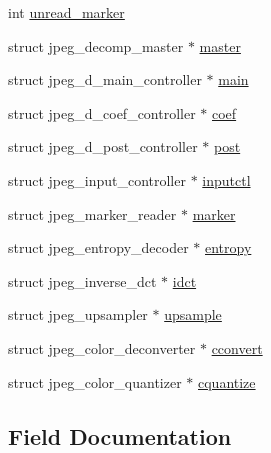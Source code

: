 \begin{DoxyCompactItemize}
int \hyperlink{structjpeg__decompress__struct_a9a030e86e1bfd0a72c520e1d18b5eef9}{unread\+\_\+marker}
\item 
struct jpeg\+\_\+decomp\+\_\+master $\ast$ \hyperlink{structjpeg__decompress__struct_ace69c5c5534a5de5b54d9c4dcd224fe6}{master}
\item 
struct jpeg\+\_\+d\+\_\+main\+\_\+controller $\ast$ \hyperlink{structjpeg__decompress__struct_aab13271d039318135ee5ca434e96c34d}{main}
\item 
struct jpeg\+\_\+d\+\_\+coef\+\_\+controller $\ast$ \hyperlink{structjpeg__decompress__struct_a25ff493a838c250917bf874a70bdb6f2}{coef}
\item 
struct jpeg\+\_\+d\+\_\+post\+\_\+controller $\ast$ \hyperlink{structjpeg__decompress__struct_aa23ccd90094cf7cf11f8f688eb28988e}{post}
\item 
struct jpeg\+\_\+input\+\_\+controller $\ast$ \hyperlink{structjpeg__decompress__struct_aba60d9f35b5b2357fd7d9b28809cb087}{inputctl}
\item 
struct jpeg\+\_\+marker\+\_\+reader $\ast$ \hyperlink{structjpeg__decompress__struct_a59a6ada58d57b412fe89e1a531323b50}{marker}
\item 
struct jpeg\+\_\+entropy\+\_\+decoder $\ast$ \hyperlink{structjpeg__decompress__struct_ac53f055b3d8103caa6c7ba4b4975eb5b}{entropy}
\item 
struct jpeg\+\_\+inverse\+\_\+dct $\ast$ \hyperlink{structjpeg__decompress__struct_a2ef67a2829f8ecebb1af0ed440bff8bf}{idct}
\item 
struct jpeg\+\_\+upsampler $\ast$ \hyperlink{structjpeg__decompress__struct_a80ad7e1c14488a065697b09679479c5d}{upsample}
\item 
struct jpeg\+\_\+color\+\_\+deconverter $\ast$ \hyperlink{structjpeg__decompress__struct_a1f88347e58f8f9d93954aa885f3497fb}{cconvert}
\item 
struct jpeg\+\_\+color\+\_\+quantizer $\ast$ \hyperlink{structjpeg__decompress__struct_ace3f4f51b8cf7bd24428ae9d10f5ddf1}{cquantize}
\end{DoxyCompactItemize}


\subsection{Field Documentation}
\mbox{\label{structjpeg__decompress__struct_a8d6e49569f3edc0ad43ffa5d6a95bb48}} 
